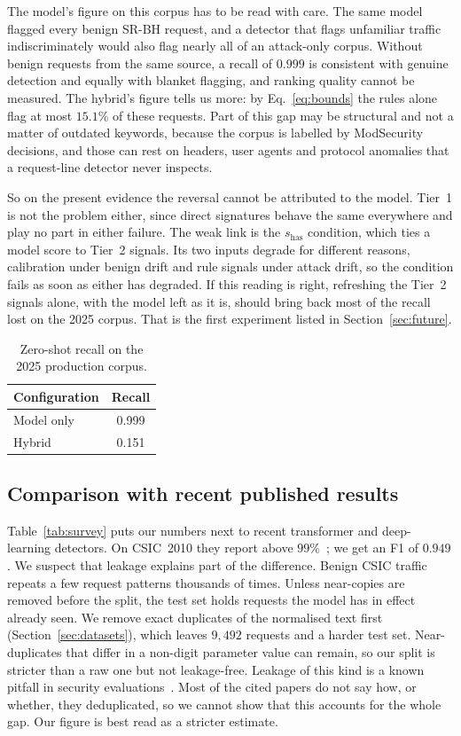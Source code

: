 \documentclass[preprint,11pt]{elsarticle}
\let\footnotesize\normalsize
\begin{document}
The model's figure on this corpus has to be read with care. The same model
flagged every benign SR-BH request, and a detector that flags unfamiliar
traffic indiscriminately would also flag nearly all of an attack-only
corpus. Without benign requests from the same source, a recall of $0.999$
is consistent with genuine detection and equally with blanket flagging, and
ranking quality cannot be measured. The hybrid's figure tells us more: by
Eq.~\eqref{eq:bounds} the rules alone flag at most $15.1\%$ of these
requests. Part of this gap may be structural and not a matter of outdated
keywords, because the corpus is labelled by ModSecurity decisions, and
those can rest on headers, user agents and protocol anomalies that a
request-line detector never inspects.

So on the present evidence the reversal cannot be attributed to the model.
Tier~1 is not the problem either, since direct signatures behave the same
everywhere and play no part in either failure. The weak link is the
$s_{\text{has}}$ condition, which ties a model score to Tier~2 signals. Its
two inputs degrade for different reasons, calibration under benign drift
and rule signals under attack drift, so the condition fails as soon as
either has degraded. If this reading is right, refreshing the Tier~2
signals alone, with the model left as it is, should bring back most of the
recall lost on the 2025 corpus. That is the first experiment listed in
Section~\ref{sec:future}.

\begin{table}[t]
\centering
\footnotesize
\caption{Zero-shot recall on the 2025 production corpus.}
\label{tab:thirdcorpus}
\begin{tabular}{@{}lc@{}}
\toprule
Configuration & Recall \\
\midrule
Model only & 0.999 \\
Hybrid & 0.151 \\
\bottomrule
\end{tabular}
\end{table}

\subsection{Comparison with recent published results}
Table~\ref{tab:survey} puts our numbers next to recent transformer and
deep-learning detectors. On CSIC~2010 they report above
$99\%$~\cite{wadbert2026,scireports2024novelxsssqli}; we get an F1 of
$0.949$. We suspect that leakage explains part of the difference. Benign
CSIC traffic repeats a few request patterns thousands of times. Unless
near-copies are removed before the split, the test set holds requests the
model has in effect already seen. We remove exact duplicates of the
normalised text first (Section~\ref{sec:datasets}), which leaves $9{,}492$
requests and a harder test set. Near-duplicates that differ in a non-digit
parameter value can remain, so our split is stricter than a raw one but
not leakage-free. Leakage of this kind is a known pitfall in security
evaluations~\cite{arp2022dos}. Most of the cited papers do not say how, or
whether, they deduplicated, so we cannot show that this accounts for the
whole gap. Our figure is best read as a stricter estimate.
\end{document}
